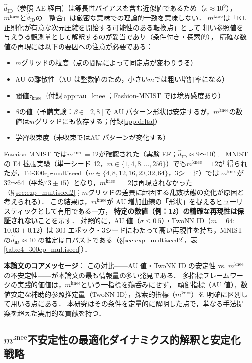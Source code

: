 \documentclass[11pt,a4paper]{jsarticle}
\newcommand{\kap}{\kappa}
\newcommand{\mknee}{m^{\mathrm{knee}}}
\begin{document}
$\hat{d}_\mathrm{ID}$（参照 AE 経由）は等長性バイアスを含む近似値であるため（$\kap \approx 10^9$），
$\mknee$と$\hat{d}_\mathrm{ID}$の「整合」は厳密な意味での理論的一致を意味しない．
$\mknee$は「KL 正則化が有意な次元圧縮を開始する可能性のある転換点」として
粗い参照値を与えうる観測量として解釈するのが妥当であり（条件付き・探索的），
精確な数値の再現には以下の要因への注意が必要である：
\begin{itemize}
  \item $m$グリッドの粒度（点の間隔によって同定点が変わりうる）
  \item AU の離散性（AU は整数値のため，小さい$m$では粗い増加率になる）
  \item 閾値$\tau_{\mathrm{knee}}$（付録\ref{app:tau_knee}；Fashion-MNIST では境界感度あり）
  \item $\beta$の値（予備実験：$\beta \in [2, 8]$で AU パターン形状は安定するが，$\mknee$の数値は$m$グリッドにも依存する；付録\ref{app:delta}）
  \item 学習収束度（未収束ではAU パターンが変化する）
\end{itemize}

Fashion-MNIST では$\mknee = 12$が確認された（実験 EF；$\hat{d}_\mathrm{ID} \approx 9$〜10）．
MNIST の E4 拡張実験（単一シード 42，$m \in \{1, 4, 8, \ldots, 256\}$）でも$\mknee = 12$が
得られたが，E4-300ep-multiseed（$m \in \{4, 8, 12, 16, 20, 32, 64\}$，3シード）では
$\mknee$が 32〜64（平均$43 \pm 15$）となり，$\mknee = 12$は再現されなかった
（§\ref{sec:exp_multiseed2}；$m$グリッドの差異に起因する乱数状態の変化が原因と考えられる）．
この結果は，$\mknee$が AU 増加曲線の「形状」を捉えるヒューリスティックとして有用である一方，
\textbf{特定の数値（例：12）の精確な再現性は保証されない}ことを示す．
対照的に，AU 値（$\sigma \leq 0.5$）・TwoNN ID（$m=64$: $10.03 \pm 0.12$）は
300 エポック・3シードにわたって高い再現性を持ち，MNIST の$\hat{d}_\mathrm{ID} \approx 10$
の推定はロバストである（§\ref{sec:exp_multiseed2}，表\ref{tab:e4_300ep_multiseed}）．

\textbf{本論文のコアメッセージ}：
この対比——AU 値・TwoNN ID の安定性 vs. $\mknee$の不安定性——が本論文の最も情報量の多い発見である．
多指標フレームワークの実践的価値は，$\mknee$という一指標を鵜呑みにせず，
頑健指標（AU 値），数値安定な補助的参照推定量（TwoNN ID），探索的指標（$\mknee$）を
明確に区別して用いる点にある．
本研究はその条件を定量的に解明した点で，単なる手法提案を超えた実用的な貢献を持つ．

\subsection{$\mknee$不安定性の最適化ダイナミクス的解釈と安定化戦略}\label{sec:disc_mknee_improve}
\end{document}
